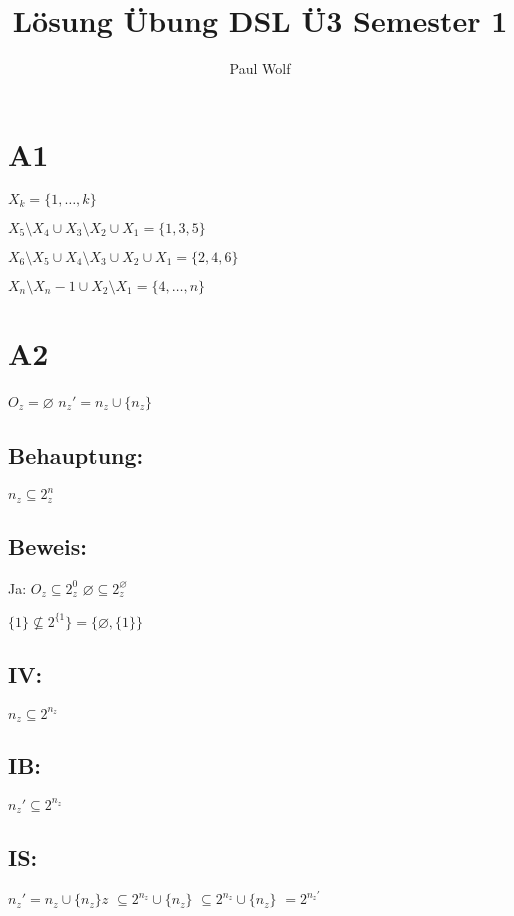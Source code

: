 \documentclass[11pt]{scrartcl}
\title{Lösung Übung DSL Ü3 Semester 1}
\author{Paul Wolf}
\begin{document}
\maketitle
\tableofcontents

\section{A1}
\label{sec:A1}

$X_k=\{1,\dots,k\}$
\begin{flushleft}
$X_5\setminus X_4 \cup X_3\setminus X_2 \cup X_1 = \{1,3,5\}$
\end{flushleft}
\begin{flushleft}
	$X_6\setminus X_5 \cup X_4\setminus X_3 \cup X_2 \cup X_1 = \{2,4,6\}$
\end{flushleft}
\begin{flushleft}
	$X_n\setminus X_n-1 \cup X_2\setminus X_1 = \{4,\dots,n\}$
\end{flushleft}

\section{A2}
\label{sec:A2}

$O_z = \varnothing$
$n_z' = n_z \cup \{n_z\}$

\subsection*{Behauptung:}
$n_z \subseteq 2^n_z$

\subsection*{Beweis:}
Ja: $O_z \subseteq 2^0_z$
$\varnothing \subseteq 2^\varnothing_z$
\begin{flushleft}
$\{1\} \nsubseteq 2^{\{1}\}=\{\varnothing,\{1\}\}$
\end{flushleft}

\subsection*{IV:} $n_z \subseteq 2^{n_z}$

\subsection*{IB:} $n_z' \subseteq 2^{n_z}$

\subsection*{IS:} $n_z' = n_z \cup \{n_z\} z$
					$\subseteq 2^{n_z} \cup \{n_z\}$
					$\subseteq 2^{n_z} \cup \{n_z\}$
					$=2^{n_z'}$
\end{document}
